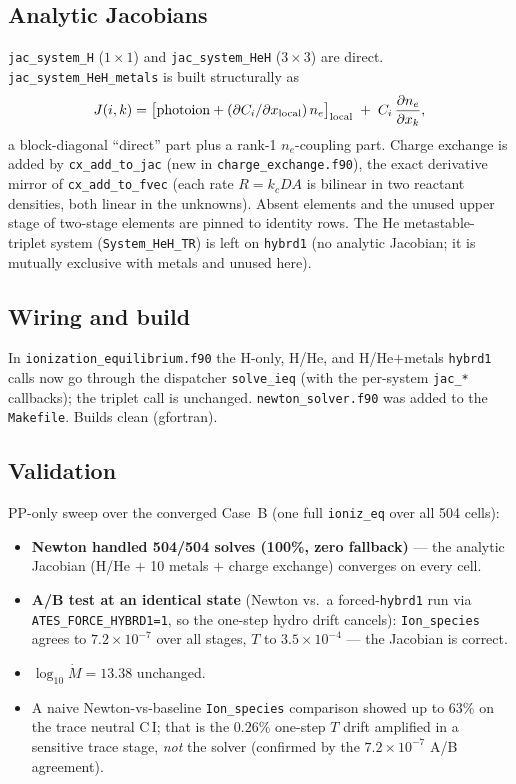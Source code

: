 \documentclass[english,a4paper]{kiseon_memo}
\begin{document}
\subsection{Analytic Jacobians}
\texttt{jac\_system\_H} ($1\times1$) and \texttt{jac\_system\_HeH} ($3\times3$) are
direct. \texttt{jac\_system\_HeH\_metals} is built structurally as
\[
J(i,k) = \big[\text{photoion} + (\partial C_i/\partial x_{\rm local})\,n_e\big]_{\rm local}
         \;+\; C_i\,\frac{\partial n_e}{\partial x_k},
\]
a block-diagonal ``direct'' part plus a rank-1 $n_e$-coupling part. Charge exchange
is added by \texttt{cx\_add\_to\_jac} (new in \texttt{charge\_exchange.f90}), the
exact derivative mirror of \texttt{cx\_add\_to\_fvec} (each rate $R=k_c D A$ is
bilinear in two reactant densities, both linear in the unknowns). Absent elements
and the unused upper stage of two-stage elements are pinned to identity rows. The
He metastable-triplet system (\texttt{System\_HeH\_TR}) is left on \texttt{hybrd1}
(no analytic Jacobian; it is mutually exclusive with metals and unused here).

\subsection{Wiring and build}
In \texttt{ionization\_\allowbreak equilibrium.f90} the H-only, H/He, and
H/He$+$metals \texttt{hybrd1} calls now go through the dispatcher
\texttt{solve\_ieq} (with the per-system \texttt{jac\_*} callbacks);
the triplet call is unchanged. \texttt{newton\_solver.f90} was added to the
\texttt{Makefile}. Builds clean (gfortran).

\subsection{Validation}
PP-only sweep over the converged Case~B (one full \texttt{ioniz\_eq} over all 504
cells):
\begin{itemize}
\item \textbf{Newton handled 504/504 solves (100\%, zero fallback)} --- the
  analytic Jacobian (H/He $+$ 10 metals $+$ charge exchange) converges on every cell.
\item \textbf{A/B test at an identical state} (Newton vs.\ a forced-\texttt{hybrd1}
  run via \texttt{ATES\_FORCE\_HYBRD1=1}, so the one-step hydro drift cancels):
  \texttt{Ion\_species} agrees to \textbf{$7.2\times10^{-7}$} over all stages, $T$
  to $3.5\times10^{-4}$ --- the Jacobian is correct.
\item $\log_{10}\dot M = 13.38$ unchanged.
\item A naive Newton-vs-baseline \texttt{Ion\_species} comparison showed up to
  $63\%$ on the trace neutral C\,I; that is the $0.26\%$ one-step $T$ drift amplified
  in a sensitive trace stage, \emph{not} the solver (confirmed by the
  $7.2\times10^{-7}$ A/B agreement).
\end{itemize}
\end{document}
